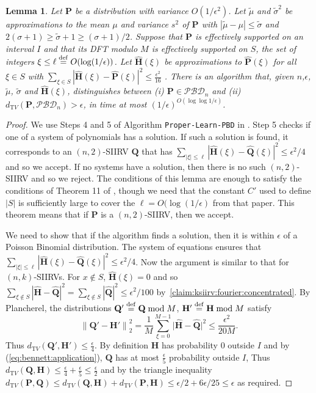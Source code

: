 \documentclass[11pt]{article}
\newtheorem{lemma}[theorem]{Lemma}
\theoremstyle{definition}
\newcommand{\p}{\mathbf{P}}
\newcommand{\q}{\mathbf{Q}}
\newcommand{\h}{\mathbf{H}}
\newcommand{\dtv}{d_{\mathrm TV}}
\newcommand{\eps}{\epsilon}
\newcommand{\norm}[1]{\lVert#1\rVert}
\newcommand{\eqdef}{\stackrel{{\mathrm {\footnotesize def}}}{=}}
\newcommand{\normtwo}[1]{{\norm{#1}}_2}
\newcommand{\dabs}[1]{\lvert #1 \rvert}
\newcommand{\classpbd}[1][n]{\ensuremath{\mathcal{PBD}_{#1}}\xspace}
\newcommand{\fourier}[1]{\widehat{#1}}
\begin{document}
\begin{lemma}
    Let $\p$ be a distribution with variance $O(1/\eps^2)$. Let $\widetilde \mu$ and $\widetilde{\sigma}^2$ be approximations to the mean $\mu$ and variance $s^2$ of $\p$ with $|\widetilde{\mu}-\mu| \leq \widetilde{\sigma}$ and $2(\sigma+1) \geq \widetilde{\sigma}+1 \geq (\sigma+1)/2$. 
Suppose that $\p$ is effectively supported on an interval $I$ and that its DFT modulo $M$ is effectively supported on $S$, the set of integers  $\xi \leq \ell\eqdef O(\log(1/\eps))$.
Let  $\fourier{\h}(\xi)$ be approximations to $\fourier{\p}(\xi)$ for all $\xi \in S$ with $\sum_{\xi \in S} |\fourier{\h}(\xi) - \fourier{\p}(\xi)|^2 \leq \frac{\eps^2}{16}$ .
 There is an algorithm that, given $n$,$\eps$,$\widetilde{\mu}$, $\widetilde{\sigma}$ and $\fourier{\h}(\xi)$, distinguishes between (i) $\p\in\classpbd[n]$ and (ii) $\dtv(\p,\classpbd[n])>\eps$, in time at most $(1/\eps)^{O(\log \log 1/\eps)}$.
 \end{lemma}
 \begin{proof}
We use Steps 4 and 5 of Algorithm \texttt{Proper-Learn-PBD} in \cite{DKS15b}. Step 5 checks if one of a system of polynomials has a solution. If such a solution is found, it corresponds to an $(n,2)$-SIIRV $\q$ that has $\sum_{|\xi| \leq \ell} |\fourier{\h}(\xi) - \fourier{\q}(\xi)|^2 \leq \eps^2/4$ and so we accept. If no systems have a solution, then there is no such $(n,2)$-SIIRV and so we reject. The conditions of this lemma are enough to satisfy the conditions of Theorem 11 of \cite{DKS15b}, though we need that the constant $C'$ used to define $|S|$ is sufficiently large to cover the $\ell=O(\log(1/\eps)$ from that paper. This theorem means that if $\p$ is a $(n,2)$-SIIRV, then we accept.

We need to show that if the algorithm finds a solution, then it is within $\eps$ of a Poisson Binomial distribution.  The system of equations ensures that $\sum_{|\xi| \leq \ell} |\fourier{\h}(\xi) - \fourier{\q}(\xi)|^2 \leq \eps^2/4$. Now the argument is similar to that for $(n,k)$-SIIRVs.
For $x \notin S$, $\fourier{\h}(\xi)=0$ and so $\sum_{\xi \notin S} |\fourier{\h}-\fourier{\q}|^2 = \sum_{\xi \notin S} |\fourier{\q}|^2 \leq \eps^2/100$ by~\cref{claim:ksiirv:fourier:concentrated}. By Plancherel, the distributions $\q'\eqdef \q \bmod M$, $\h'\eqdef \h \bmod M$ satisfy 
\[
  \normtwo{ \q'-\h'}^2 = \frac{1}{M}\sum_{\xi=0}^{M-1} \dabs{ \fourier{\h}-\fourier{\q} }^2 \leq \frac{\eps^2}{20M}.
\] Thus $\dtv(\q',\h') \leq \frac{\eps}{4}$. By definition $\h$ has probability $0$ outside $I$ and by (\ref{eq:bennett:application}), $\q$ has at most $\frac{\eps}{5}$ probability outside $I$, Thus $\dtv(\q,\h) \leq \frac{\eps}{4}+\frac{\eps}{5} \leq \frac{\eps}{2}$ and by the triangle inequality $\dtv(\p,\q) \leq \dtv(\q,\h) + \dtv(\p,\h) \leq \eps/2 + 6\eps/25 \leq \eps$ as required.
 \end{proof}
 
\end{document}
